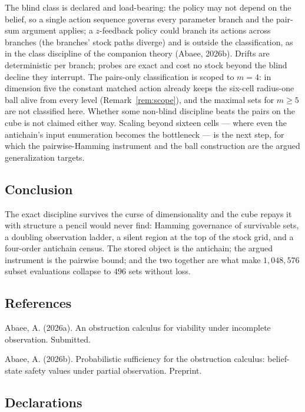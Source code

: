 \documentclass[10pt,twocolumn]{article}
\theoremstyle{plain}
\theoremstyle{definition}
\theoremstyle{remark}
\begin{document}
The blind class is declared and load-bearing: the policy may not
depend on the belief, so a single action sequence governs every
parameter branch and the pair-sum argument applies; a
\(z\)-feedback policy could branch its actions across branches (the
branches' stock paths diverge) and is outside the classification, as in the class discipline of the companion theory (Abaee, 2026b). Drifts are
deterministic per branch; probes are exact and cost no stock beyond
the blind decline they interrupt. The pairs-only classification is scoped to
\(m = 4\): in dimension five the constant matched action already
keeps the six-cell radius-one ball alive from every level
(Remark~\ref{rem:scope}), and the maximal sets for \(m \ge 5\) are
not classified here. Whether some non-blind discipline
beats the pairs on the cube is not claimed either way. Scaling beyond
sixteen cells --- where even the antichain's input enumeration becomes
the bottleneck --- is the next step, for which the pairwise-Hamming
instrument and the ball construction are the argued generalization
targets.

\subsection{Conclusion}\label{conclusion}

The exact discipline survives the curse of dimensionality and the
cube repays it with structure a pencil would never find: Hamming
governance of survivable sets, a doubling observation ladder, a
silent region at the top of the stock grid, and a four-order
antichain census. The stored object is the antichain; the argued
instrument is the pairwise bound; and the two together are what make
\(1{,}048{,}576\) subset evaluations collapse to \(496\) sets without
loss.

\subsection*{References}

{\footnotesize
Abaee, A. (2026a). An obstruction calculus for viability under incomplete observation. Submitted.

Abaee, A. (2026b). Probabilistic sufficiency for the obstruction calculus: belief-state safety values under partial observation. Preprint.


}

\subsection*{Declarations}
\end{document}
